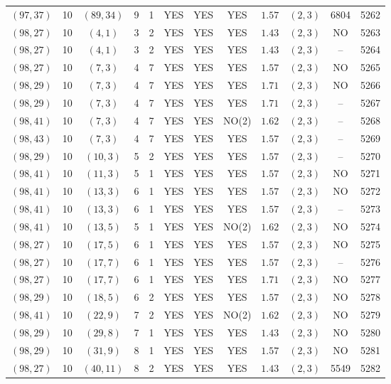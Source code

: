 \begin{longtable}{|c|c|c|c|c|c|c|c|c|c|c|c|}
$(97,37)$ & 10 & $(89,34)$ & 9 & 1 & YES & YES & YES & $1.57$ & $(2,3)$ & 6804 & 5262\\
$(98,27)$ & 10 & $(4,1)$ & 3 & 2 & YES & YES & YES & $1.43$ & $(2,3)$ & NO & 5263\\
$(98,27)$ & 10 & $(4,1)$ & 3 & 2 & YES & YES & YES & $1.43$ & $(2,3)$ & -- & 5264\\
$(98,27)$ & 10 & $(7,3)$ & 4 & 7 & YES & YES & YES & $1.57$ & $(2,3)$ & NO & 5265\\
$(98,29)$ & 10 & $(7,3)$ & 4 & 7 & YES & YES & YES & $1.71$ & $(2,3)$ & NO & 5266\\
$(98,29)$ & 10 & $(7,3)$ & 4 & 7 & YES & YES & YES & $1.71$ & $(2,3)$ & -- & 5267\\
$(98,41)$ & 10 & $(7,3)$ & 4 & 7 & YES & YES & NO(2) & $1.62$ & $(2,3)$ & -- & 5268\\
$(98,43)$ & 10 & $(7,3)$ & 4 & 7 & YES & YES & YES & $1.57$ & $(2,3)$ & -- & 5269\\
$(98,29)$ & 10 & $(10,3)$ & 5 & 2 & YES & YES & YES & $1.57$ & $(2,3)$ & -- & 5270\\
$(98,41)$ & 10 & $(11,3)$ & 5 & 1 & YES & YES & YES & $1.57$ & $(2,3)$ & NO & 5271\\
$(98,41)$ & 10 & $(13,3)$ & 6 & 1 & YES & YES & YES & $1.57$ & $(2,3)$ & NO & 5272\\
$(98,41)$ & 10 & $(13,3)$ & 6 & 1 & YES & YES & YES & $1.57$ & $(2,3)$ & -- & 5273\\
$(98,41)$ & 10 & $(13,5)$ & 5 & 1 & YES & YES & NO(2) & $1.62$ & $(2,3)$ & NO & 5274\\
$(98,27)$ & 10 & $(17,5)$ & 6 & 1 & YES & YES & YES & $1.57$ & $(2,3)$ & NO & 5275\\
$(98,27)$ & 10 & $(17,7)$ & 6 & 1 & YES & YES & YES & $1.57$ & $(2,3)$ & -- & 5276\\
$(98,27)$ & 10 & $(17,7)$ & 6 & 1 & YES & YES & YES & $1.71$ & $(2,3)$ & NO & 5277\\
$(98,29)$ & 10 & $(18,5)$ & 6 & 2 & YES & YES & YES & $1.57$ & $(2,3)$ & NO & 5278\\
$(98,41)$ & 10 & $(22,9)$ & 7 & 2 & YES & YES & NO(2) & $1.62$ & $(2,3)$ & NO & 5279\\
$(98,29)$ & 10 & $(29,8)$ & 7 & 1 & YES & YES & YES & $1.43$ & $(2,3)$ & NO & 5280\\
$(98,29)$ & 10 & $(31,9)$ & 8 & 1 & YES & YES & YES & $1.57$ & $(2,3)$ & NO & 5281\\
$(98,27)$ & 10 & $(40,11)$ & 8 & 2 & YES & YES & YES & $1.43$ & $(2,3)$ & 5549 & 5282\\

\end{longtable}

